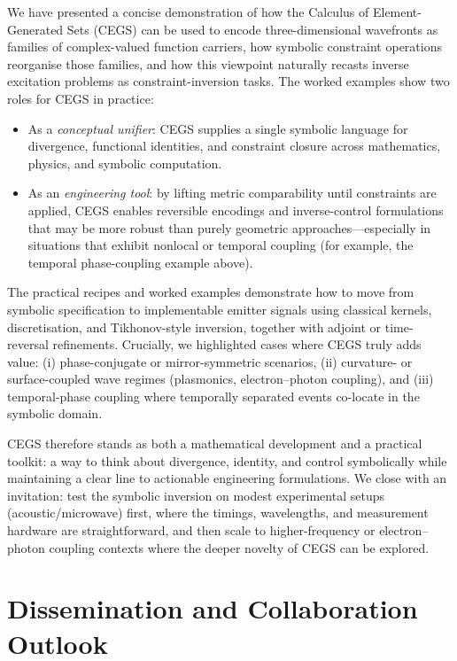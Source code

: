 \documentclass[11pt]{article}
\theoremstyle{plain}
\theoremstyle{definition}
\theoremstyle{remark}
\begin{document}
We have presented a concise demonstration of how the Calculus of Element-Generated Sets (CEGS)
can be used to encode three-dimensional wavefronts as families of complex-valued function carriers,
how symbolic constraint operations reorganise those families, and how this viewpoint naturally
recasts inverse excitation problems as constraint-inversion tasks. The worked examples show two
roles for CEGS in practice:

\begin{itemize}[leftmargin=*,itemsep=4pt]
  \item As a \emph{conceptual unifier}: CEGS supplies a single symbolic language for divergence,
        functional identities, and constraint closure across mathematics, physics, and symbolic
        computation.
  \item As an \emph{engineering tool}: by lifting metric comparability until constraints are applied,
        CEGS enables reversible encodings and inverse-control formulations that may be more robust
        than purely geometric approaches—especially in situations that exhibit nonlocal or temporal
        coupling (for example, the temporal phase-coupling example above).
\end{itemize}

The practical recipes and worked examples demonstrate how to move from symbolic
specification to implementable emitter signals using classical kernels, discretisation,
and Tikhonov-style inversion, together with adjoint or time-reversal refinements.
Crucially, we highlighted cases where CEGS truly adds value: (i) phase-conjugate or
mirror-symmetric scenarios, (ii) curvature- or surface-coupled wave regimes (plasmonics,
electron–photon coupling), and (iii) temporal-phase coupling where temporally separated
events co-locate in the symbolic domain.



CEGS therefore stands as both a mathematical development and a practical toolkit: a way to
think about divergence, identity, and control symbolically while maintaining a clear line
to actionable engineering formulations. We close with an invitation: test the symbolic inversion
on modest experimental setups (acoustic/microwave) first, where the timings, wavelengths,
and measurement hardware are straightforward, and then scale to higher-frequency or
electron–photon coupling contexts where the deeper novelty of CEGS can be explored.

\vspace{12pt}
\section*{Dissemination and Collaboration Outlook}
\end{document}
